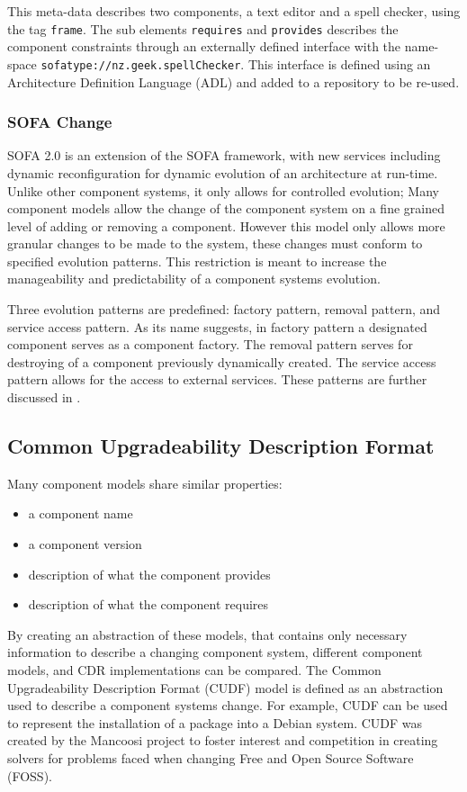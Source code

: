This meta-data describes two components, a text editor and a spell checker, using the tag \texttt{frame}.
The sub elements \texttt{requires} and \texttt{provides} describes the component constraints through an externally defined interface with the name-space \texttt{sofatype://nz.geek.spellChecker}.
This interface is defined using an Architecture Definition Language (ADL) and added to a repository to be re-used. 


\subsubsection{SOFA Change}
SOFA 2.0 is an extension of the SOFA framework, with new services including dynamic reconfiguration for dynamic evolution of an architecture at run-time. 
Unlike other component systems,
it only allows for controlled evolution; 
Many component models allow the change of the component system on a fine grained level of adding or removing a component.
However this model only allows more granular changes to be made to the system, these changes must conform to specified evolution patterns.
This restriction is meant to increase the manageability and predictability of a component systems evolution. 

Three evolution patterns are predefined: factory pattern, removal pattern, and service access pattern.
As its name suggests, in factory pattern a designated component serves as a component factory. 
The removal pattern serves for destroying of a component previously dynamically created.
The service access pattern allows for the access to external services.
These patterns are further discussed in \citep{Hnetynka2006}.


\subsection{Common Upgradeability Description Format}
Many component models share similar properties:
\begin{itemize}
  \item a component name
  \item a component version
  \item description of what the component provides
  \item description of what the component requires
\end{itemize} 

By creating an abstraction of these models, that contains only necessary information to describe a changing component system, different component models, and CDR implementations can be compared.
The Common Upgradeability Description Format (CUDF) model is defined as an abstraction used to describe a component systems change.
For example, CUDF can be used to represent the installation of a package into a Debian system.
CUDF was created by the Mancoosi project to foster interest and competition in creating solvers for problems faced when changing Free and Open Source Software (FOSS).

